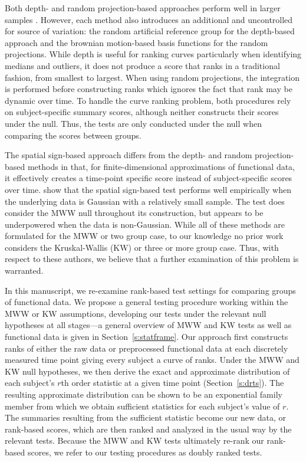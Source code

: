 \documentclass[12pt]{article}
\theoremstyle{plain}
\begin{document}
	Both depth- and random projection-based approaches perform well in larger samples \citep{Lopez2009,Lopez2010,Melendez2021}. However, each method also introduces an additional and uncontrolled for source of variation: the random artificial reference group for the depth-based approach and the brownian motion-based basis functions for the random projections. While depth is useful for ranking curves particularly when identifying medians and outliers, it does not produce a score that ranks in a traditional fashion, from smallest to largest. When using random projections, the integration is performed before constructing ranks which ignores the fact that rank may be dynamic over time. To handle the curve ranking problem, both procedures rely on subject-specific summary scores, although neither constructs their scores under the null. Thus, the tests are only conducted under the null when comparing the scores between groups. 
	
	The spatial sign-based approach differs from the depth- and random projection-based methods in that, for finite-dimensional approximations of functional data, it effectively creates a time-point specific score instead of subject-specific scores over time.
	\cite{Chak2015} show that the spatial sign-based test performs well empirically when the underlying data is Gaussian with a relatively small sample. The test does consider the MWW null throughout its construction, but appears to be underpowered when the data is non-Gaussian. While all of these methods are formulated for the MWW or two group case, to our knowledge no prior work considers the Kruskal-Wallis (KW) or three or more group case. Thus, with respect to these authors, we believe that a further examination of this problem is warranted. 
	
	In this manuscript, we re-examine rank-based test settings for comparing groups of functional data. We propose a general testing procedure working within the MWW or KW assumptions, developing our tests under the relevant null hypotheses at all stages---a general overview of MWW and KW tests as well as functional data is given in Section~\ref{s:statframe}. Our approach first constructs ranks of either the raw data or preprocessed functional data at each discretely measured time point giving every subject a curve of ranks. Under the MWW and KW null hypotheses, we then derive the exact and approximate distribution of each subject's $r$th order statistic at a given time point (Section~\ref{s:drts}). The resulting approximate distribution can be shown to be an exponential family member from which we obtain sufficient statistics for each subject's value of $r$. The summaries resulting from the sufficient statistic become our new data, or rank-based scores, which are then ranked and analyzed in the usual way by the relevant tests. Because the MWW and KW tests ultimately re-rank our rank-based scores, we refer to our testing procedures as doubly ranked tests.
	
\end{document}
